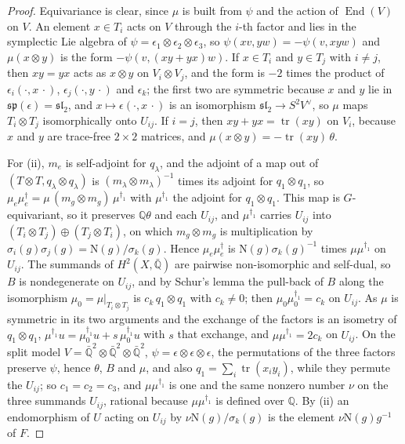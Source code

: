 \documentclass[11pt,reqno]{amsart}
\theoremstyle{plain}
\theoremstyle{definition}
\theoremstyle{remark}
\newcommand{\QQ}{\mathbb{Q}}
\newcommand{\Nm}{\mathrm{N}}             %
\DeclareMathOperator{\End}{End}
\begin{document}
\begin{proof}
Equivariance is clear, since $\mu$ is built from $\psi$ and the action of
$\End(V)$ on $V$. An element $x\in T_{i}$ acts on $V$ through the $i$-th factor
and lies in the symplectic Lie algebra of $\psi=\epsilon_{1}\otimes
\epsilon_{2}\otimes\epsilon_{3}$, so $\psi(xv,yw)=-\psi(v,xyw)$ and
$\mu(x\otimes y)$ is the form $-\psi(v,(xy+yx)w)$. If $x\in T_{i}$ and
$y\in T_{j}$ with $i\ne j$, then $xy=yx$ acts as $x\otimes y$ on
$V_{i}\otimes V_{j}$, and the form is $-2$ times the product of
$\epsilon_{i}(\cdot,x\,\cdot)$, $\epsilon_{j}(\cdot,y\,\cdot)$ and
$\epsilon_{k}$; the first two are symmetric because $x$ and $y$ lie in
$\mathfrak{sp}(\epsilon)=\mathfrak{sl}_{2}$, and $x\mapsto\epsilon(\cdot,x\,\cdot)$
is an isomorphism $\mathfrak{sl}_{2}\to S^{2}V^{\vee}$, so $\mu$ maps
$T_{i}\otimes T_{j}$ isomorphically onto $U_{ij}$. If $i=j$, then
$xy+yx=\operatorname{tr}(xy)$ on $V_{i}$, because $x$ and $y$ are trace-free
$2\times2$ matrices, and $\mu(x\otimes y)=-\operatorname{tr}(xy)\,\theta$.

For (ii), $m_{e}$ is self-adjoint for $q_{\lambda}$, and the adjoint of a
map out of $(T\otimes T,q_{\lambda}\otimes q_{\lambda})$ is
$(m_{\lambda}\otimes m_{\lambda})^{-1}$ times its adjoint for
$q_{1}\otimes q_{1}$, so
$\mu_{e}\mu_{e}^{\dagger}=\mu\,(m_{g}\otimes m_{g})\,\mu^{\dagger_{1}}$ with
$\mu^{\dagger_{1}}$ the adjoint for $q_{1}\otimes q_{1}$. This map is
$G$-equivariant, so it preserves $\QQ\theta$ and each $U_{ij}$, and
$\mu^{\dagger_{1}}$ carries $U_{ij}$ into
$(T_{i}\otimes T_{j})\oplus(T_{j}\otimes T_{i})$, on which $m_{g}\otimes m_{g}$
is multiplication by $\sigma_{i}(g)\sigma_{j}(g)=\Nm(g)/\sigma_{k}(g)$. Hence
$\mu_{e}\mu_{e}^{\dagger}$ is $\Nm(g)\sigma_{k}(g)^{-1}$ times
$\mu\mu^{\dagger_{1}}$ on $U_{ij}$. The summands of $H^{2}(X,\bar{\QQ})$ are
pairwise non-isomorphic and self-dual, so $B$ is nondegenerate on $U_{ij}$,
and by Schur's lemma the pull-back of $B$ along the isomorphism
$\mu_{0}=\mu|_{T_{i}\otimes T_{j}}$ is $c_{k}\,q_{1}\otimes q_{1}$ with
$c_{k}\ne0$; then $\mu_{0}\mu_{0}^{\dagger_{1}}=c_{k}$ on $U_{ij}$. As $\mu$
is symmetric in its two arguments and the exchange of the factors is an
isometry of $q_{1}\otimes q_{1}$, $\mu^{\dagger_{1}}u=\mu_{0}^{\dagger_{1}}u+
s\,\mu_{0}^{\dagger_{1}}u$ with $s$ that exchange, and $\mu\mu^{\dagger_{1}}=2c_{k}$
on $U_{ij}$. On the split model $V=\bar{\QQ}^{2}\otimes\bar{\QQ}^{2}\otimes
\bar{\QQ}^{2}$, $\psi=\epsilon\otimes\epsilon\otimes\epsilon$, the
permutations of the three factors preserve $\psi$, hence $\theta$, $B$ and
$\mu$, and also $q_{1}=\sum_{i}\operatorname{tr}(x_{i}y_{i})$, while they
permute the $U_{ij}$; so $c_{1}=c_{2}=c_{3}$, and $\mu\mu^{\dagger_{1}}$ is one
and the same nonzero number $\nu$ on the three summands $U_{ij}$, rational
because $\mu\mu^{\dagger_{1}}$ is defined over $\QQ$. By (ii) an endomorphism of $U$ acting
on $U_{ij}$ by $\nu\Nm(g)/\sigma_{k}(g)$ is the element $\nu\Nm(g)g^{-1}$ of
$F$.
\end{proof}
\end{document}
